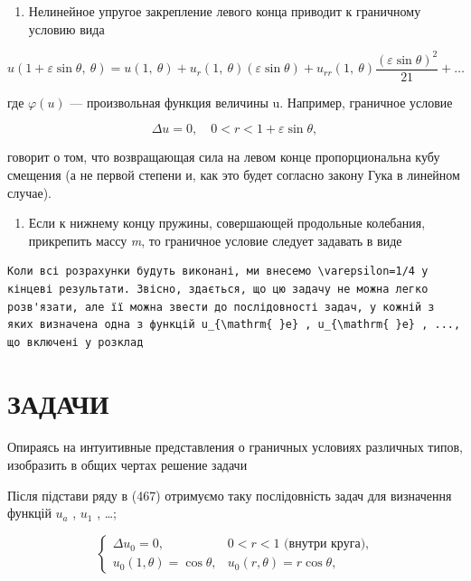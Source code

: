 \documentclass[
  ukrainian,
]{article}
\providecommand{\tightlist}{%
  \setlength{\itemsep}{0pt}\setlength{\parskip}{0pt}}
\begin{document}
\begin{enumerate}
\def\labelenumi{\arabic{enumi}.}
\setcounter{enumi}{1}
\tightlist
\item
  Нелинейное упругое закрепление левого конца приводит к граничному
  условию вида
\end{enumerate}

\[
u(1+\varepsilon\sin\theta,\ \theta)=u(1,\ \theta)+u_r(1,\ \theta)(\varepsilon\sin\theta)+u_{rr}(1,\ \theta)\frac{(\varepsilon\sin\theta)^2}{21}+\ldots
\]

где \(\varphi(u)\) --- произвольная функция величины u. Например,
граничное условие

\[
\Delta u = 0, \quad 0 < r < 1 + \varepsilon \sin \theta,
\]

говорит о том, что возвращающая сила на левом конце пропорциональна кубу
смещения (а не первой степени и, как это будет согласно закону Гука в
линейном случае).

\begin{enumerate}
\def\labelenumi{\arabic{enumi}.}
\setcounter{enumi}{2}
\tightlist
\item
  Если к нижнему концу пружины, совершающей продольные колебания,
  прикрепить массу \emph{m}, то граничное условие следует задавать в
  виде
\end{enumerate}

\begin{verbatim}
Коли всі розрахунки будуть виконані, ми внесемо \varepsilon=1/4 у кінцеві результати. Звісно, здається, що цю задачу не можна легко розв'язати, але її можна звести до послідовності задач, у кожній з яких визначена одна з функцій u_{\mathrm{ }e} , u_{\mathrm{ }e} , ..., що включені у розклад
\end{verbatim}

\section{ЗАДАЧИ}\label{ux437ux430ux434ux430ux447ux438-2}

Опираясь на интуитивные представления о граничных условиях различных
типов, изобразить в общих чертах решение задачи

Після підстави ряду в (467) отримуємо таку послідовність задач для
визначення функцій \(u_a\) , \(u_1\) , \ldots;

\[
\begin{cases} \Delta u_{0} = 0, & 0 < r < 1 \text{ (внутри круга),} \\ u_{0}(1, \theta) = \cos \theta, & u_{0}(r, \theta) = r \cos \theta, \end{cases}
\]
\end{document}

